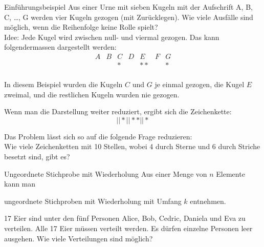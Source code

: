 \begin{bsp}
    {Einführungsbeispiel}{}
    Aus einer Urne mit sieben Kugeln mit der Aufschrift A, B, C, \dots, G werden vier Kugeln gezogen (mit Zurücklegen). Wie viele Ausfälle sind möglich, wenn die Reihenfolge keine Rolle spielt? \\

    Idee: Jede Kugel wird zwischen null- und viermal gezogen. Das kann folgendermassen dargestellt werden:
    \[
        \begin{array}{c|c|c|c|c|c|c}
            A & B & C & D & E  & F & G \\
              &   & * &   & ** &   & * \\
        \end{array}
    \]

    In diesem Beispiel wurden die Kugeln \(C\) und \(G\) je einmal gezogen, die Kugel \(E\) zweimal, und die restlichen Kugeln wurden nie gezogen.

    Wenn man die Darstellung weiter reduziert, ergibt sich die Zeichenkette:
    \[
        ||*||**||*
    \]

    Das Problem lässt sich so auf die folgende Frage reduzieren: \\
    Wie viele Zeichenketten mit 10 Stellen, wobei 4 durch Sterne und 6 durch Striche besetzt sind, gibt es?


    \vspace{2cm}

\end{bsp}

\begin{satz}
    {Ungeordnete Stichprobe mit Wiederholung }{}
    Aus einer Menge von \(n\) Elemente kann man

    \vspace{2cm}

    ungeordnete Stichproben mit Wiederholung mit Umfang \(k\) entnehmen.
\end{satz}
\begin{bsp}
    {}{}
    17 Eier sind unter den fünf Personen Alice, Bob, Cedric, Daniela und Eva zu verteilen. Alle 17 Eier müssen verteilt werden. Es dürfen einzelne Personen leer ausgehen. Wie viele Verteilungen sind möglich?

    \vspace{2cm}

\end{bsp}










